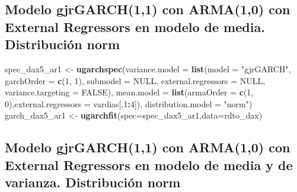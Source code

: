 \documentclass[
  11pt,
]{article}
\newenvironment{Shaded}{\begin{snugshade}}{\end{snugshade}}
\newcommand{\DataTypeTok}[1]{\textcolor[rgb]{0.13,0.29,0.53}{#1}}
\newcommand{\DecValTok}[1]{\textcolor[rgb]{0.00,0.00,0.81}{#1}}
\newcommand{\KeywordTok}[1]{\textcolor[rgb]{0.13,0.29,0.53}{\textbf{#1}}}
\newcommand{\NormalTok}[1]{#1}
\newcommand{\OperatorTok}[1]{\textcolor[rgb]{0.81,0.36,0.00}{\textbf{#1}}}
\newcommand{\OtherTok}[1]{\textcolor[rgb]{0.56,0.35,0.01}{#1}}
\newcommand{\StringTok}[1]{\textcolor[rgb]{0.31,0.60,0.02}{#1}}
\begin{document}
\hypertarget{modelo-gjrgarch11-con-arma10-con-external-regressors-en-modelo-de-media.-distribuciuxf3n-norm}{%
\subsection{Modelo gjrGARCH(1,1) con ARMA(1,0) con External Regressors
en modelo de media. Distribución
norm}\label{modelo-gjrgarch11-con-arma10-con-external-regressors-en-modelo-de-media.-distribuciuxf3n-norm}}

\begin{Shaded}
\begin{Highlighting}[]
\NormalTok{spec_dax5_ar1 <-}\StringTok{ }\KeywordTok{ugarchspec}\NormalTok{(}\DataTypeTok{variance.model =} \KeywordTok{list}\NormalTok{(}\DataTypeTok{model =} \StringTok{"gjrGARCH"}\NormalTok{, }\DataTypeTok{garchOrder =} \KeywordTok{c}\NormalTok{(}\DecValTok{1}\NormalTok{, }\DecValTok{1}\NormalTok{), }
                    \DataTypeTok{submodel =} \OtherTok{NULL}\NormalTok{, }\DataTypeTok{external.regressors =} \OtherTok{NULL}\NormalTok{, }\DataTypeTok{variance.targeting =} \OtherTok{FALSE}\NormalTok{), }
                    \DataTypeTok{mean.model =} \KeywordTok{list}\NormalTok{(}\DataTypeTok{armaOrder =} \KeywordTok{c}\NormalTok{(}\DecValTok{1}\NormalTok{, }\DecValTok{0}\NormalTok{),}\DataTypeTok{external.regressors =}\NormalTok{ vardias[,}\DecValTok{1}\OperatorTok{:}\DecValTok{4}\NormalTok{]),}
               \DataTypeTok{distribution.model =} \StringTok{"norm"}\NormalTok{)}
\NormalTok{garch_dax5_ar1 <-}\StringTok{ }\KeywordTok{ugarchfit}\NormalTok{(}\DataTypeTok{spec=}\NormalTok{spec_dax5_ar1,}\DataTypeTok{data=}\NormalTok{rdto_dax)}
\end{Highlighting}
\end{Shaded}

\hypertarget{modelo-gjrgarch11-con-arma10-con-external-regressors-en-modelo-de-media-y-de-varianza.-distribuciuxf3n-norm}{%
\subsection{Modelo gjrGARCH(1,1) con ARMA(1,0) con External Regressors
en modelo de media y de varianza. Distribución
norm}\label{modelo-gjrgarch11-con-arma10-con-external-regressors-en-modelo-de-media-y-de-varianza.-distribuciuxf3n-norm}}
\end{document}
